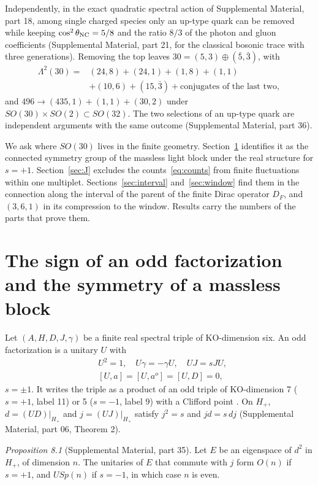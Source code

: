 \documentclass[aps,prd,reprint,onecolumn,nofootinbib,amsmath,amssymb,floatfix]{revtex4-2}
\theoremstyle{plain}
\newcommand{\supp}[1]{Supplemental Material, part #1}
\begin{document}
Independently, in the exact quadratic spectral action of \supp{18}, among single charged species only an up-type quark can be removed while keeping $\cos^2\theta_{\rm NC}=5/8$ and the ratio $8/3$ of the photon and gluon coefficients (\supp{21}, for the classical bosonic trace with three generations). Removing the top leaves $30=(5,3)\oplus(\bar5,\bar3)$, with
\begin{equation}\label{eq:branching}
\begin{split}
\Lambda^2(30)={}&(24,8)+(24,1)+(1,8)+(1,1)\\
&+(10,6)+(15,\bar3)+\text{conjugates of the last two},
\end{split}
\end{equation}
and $496\to(435,1)+(1,1)+(30,2)$ under $SO(30)\times SO(2)\subset SO(32)$. The two selections of an up-type quark are independent arguments with the same outcome (\supp{36}).

We ask where $SO(30)$ lives in the finite geometry. Section~\ref{sec:sign} identifies it as the connected symmetry group of the massless light block under the real structure for $s=+1$. Section~\ref{sec:J} excludes the counts~\eqref{eq:counts} from finite fluctuations within one multiplet. Sections~\ref{sec:interval} and~\ref{sec:window} find them in the connection along the interval of the parent of the finite Dirac operator $D_F$, and $(3,6,1)$ in its compression to the window. Results carry the numbers of the parts that prove them.

\section{The sign of an odd factorization and the symmetry of a massless block}\label{sec:sign}

Let $(A,H,D,J,\gamma)$ be a finite real spectral triple of KO-dimension six. An odd factorization is a unitary $U$ with
\begin{equation}
\begin{split}
&U^2=1,\quad U\gamma=-\gamma U,\quad UJ=sJU,\\
&[U,a]=[U,a^o]=[U,D]=0,
\end{split}
\end{equation}
$s=\pm1$. It writes the triple as a product of an odd triple of KO-dimension 7 ($s=+1$, label 11) or 5 ($s=-1$, label 9) with a Clifford point \cite{DD2011,towerlesspaper}. On $H_+$, $d=(UD)|_{H_+}$ and $j=(UJ)|_{H_+}$ satisfy $j^2=s$ and $jd=s\,dj$ (\supp{06}, Theorem 2).

\smallskip\noindent\textit{Proposition 8.1} (\supp{35}). Let $E$ be an eigenspace of $d^2$ in $H_+$, of dimension $n$. The unitaries of $E$ that commute with $j$ form $O(n)$ if $s=+1$, and $USp(n)$ if $s=-1$, in which case $n$ is even.
\smallskip
\end{document}
